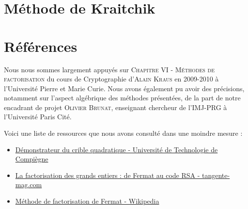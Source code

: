 \documentclass[11pt,a4paper]{article}
\begin{document}
	\newpage
	
	\section{\LARGE{Méthode de Kraitchik}}
	
	\newpage
	\section{\Large{Références}}
	Nous nous sommes largement appuyés sur \textsc{Chapitre VI - Méthodes de factorisation} du cours de Cryptographie d'\textsc{Alain Kraus} en 2009-2010 à l'Université Pierre et Marie Curie. Nous avons également pu avoir des précisions, notamment sur l'aspect algébrique des méthodes présentées, de la part de notre encadrant de projet \textsc{Olivier Brunat}, enseignant chercheur de l'IMJ-PRG à l'Université Paris Cité.
	
	Voici une liste de ressources que nous avons consulté dans une moindre mesure : 
	\begin{itemize}
		\item \href{https://www.utc.fr/~wschon/sr06/UtCrible/UtCrible.html#about}{Démonstrateur du crible quadratique - Université de Technologie de Compiègne}
		\item \href{https://www.tangente-mag.com/article.php?id=7059}{La factorisation des grands entiers : de Fermat au code RSA - tangente-mag.com}
		\item \href{https://fr.wikipedia.org/wiki/M%C3%A9thode_de_factorisation_de_Fermat}{Méthode de factorisation de Fermat - Wikipedia}	
	\end{itemize}
	
	
	
\end{document}
